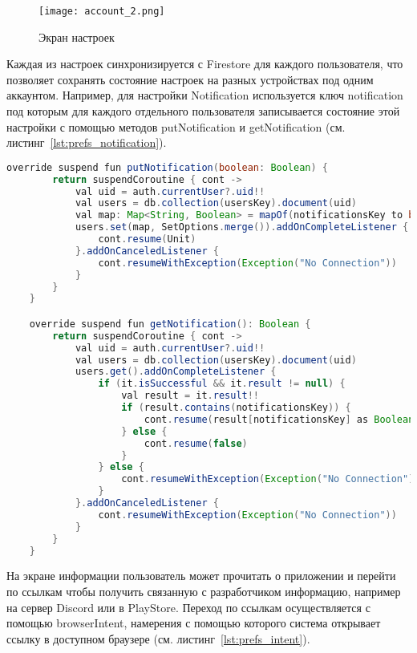 \begin{figure}[H]
 \centering
   \texttt{[image: account\_2.png]} 
   \caption{Экран настроек}
   \label{fig:arch:account_2}
\end{figure}

Каждая из настроек синхронизируется с Firestore для каждого пользователя, что позволяет сохранять состояние настроек на разных устройствах под одним аккаунтом. Например, для настройки Notification используется ключ notification под которым для каждого отдельного пользователя записывается состояние этой настройки с помощью методов putNotification и getNotification  (см. листинг~\ref{lst:prefs_notification}).

\begin{lstlisting}[language=Java,label={lst:prefs_notification},caption={Методы для Notification}]
    override suspend fun putNotification(boolean: Boolean) {
        return suspendCoroutine { cont ->
            val uid = auth.currentUser?.uid!!
            val users = db.collection(usersKey).document(uid)
            val map: Map<String, Boolean> = mapOf(notificationsKey to boolean)
            users.set(map, SetOptions.merge()).addOnCompleteListener {
                cont.resume(Unit)
            }.addOnCanceledListener {
                cont.resumeWithException(Exception("No Connection"))
            }
        }
    }

    override suspend fun getNotification(): Boolean {
        return suspendCoroutine { cont ->
            val uid = auth.currentUser?.uid!!
            val users = db.collection(usersKey).document(uid)
            users.get().addOnCompleteListener {
                if (it.isSuccessful && it.result != null) {
                    val result = it.result!!
                    if (result.contains(notificationsKey)) {
                        cont.resume(result[notificationsKey] as Boolean)
                    } else {
                        cont.resume(false)
                    }
                } else {
                    cont.resumeWithException(Exception("No Connection"))
                }
            }.addOnCanceledListener {
                cont.resumeWithException(Exception("No Connection"))
            }
        }
    }
\end{lstlisting}

На экране информации пользователь может прочитать о приложении и перейти по ссылкам чтобы получить связанную с разработчиком информацию, например на сервер Discord или в PlayStore. Переход по ссылкам осуществляется с помощью browserIntent, намерения с помощью которого система открывает ссылку в доступном браузере (см. листинг~\ref{lst:prefs_intent}).

